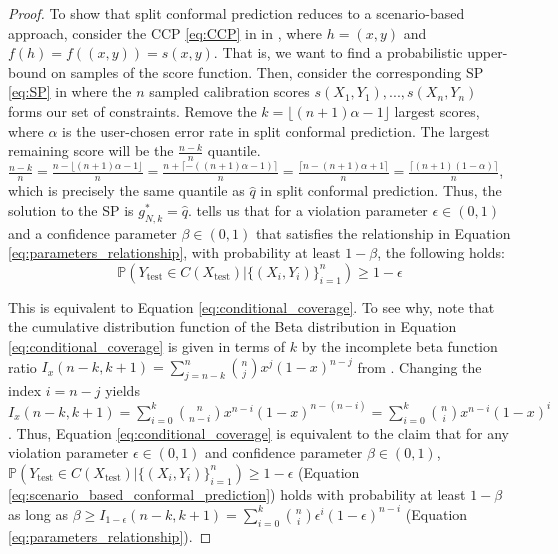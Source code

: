 \begin{proof}
    
To show that split conformal prediction reduces to a scenario-based approach, consider the CCP \eqref{eq:CCP} in  in , where $h=(x,y)$ and $f(h)=f\left((x,y)\right)=s(x,y)$.
That is, we want to find a probabilistic upper-bound on samples of the score function.
Then, consider the corresponding SP \eqref{eq:SP} in  where the $n$ sampled calibration scores $s(X_1, Y_1), ..., s(X_n, Y_n)$ forms our set of constraints.
Remove the $k=\lfloor (n+1)\alpha-1 \rfloor$ largest scores, where $\alpha$ is the user-chosen error rate in split conformal prediction.
The largest remaining score will be the $\frac{n-k}{n}$ quantile.
$\frac{n-k}{n}=\frac{n-\lfloor (n+1)\alpha-1 \rfloor}{n}=\frac{n+\lceil -((n+1)\alpha-1) \rceil}{n}=\frac{\lceil n -(n+1)\alpha + 1 \rceil}{n}=\frac{\lceil (n+1)(1-\alpha) \rceil}{n}$, which is precisely the same quantile as $\hat{q}$ in split conformal prediction. Thus, the solution to the SP is $g^*_{N,k}=\hat{q}$.  tells us that for a violation parameter $\epsilon \in (0, 1)$ and a confidence parameter $\beta \in (0, 1)$ that satisfies the relationship in Equation \eqref{eq:parameters_relationship}, with probability at least $1-\beta$, the following holds:
\begin{equation}\label{eq:scenario_based_conformal_prediction}
    \mathbb{P}\left( Y_\text{test} \in C(X_\text{test}) | \{ (X_i, Y_i) \}^n_{i=1} \right) \ge 1-\epsilon
\end{equation}

This is equivalent to Equation \eqref{eq:conditional_coverage}. To see why, note that the cumulative distribution function of the Beta distribution in Equation \eqref{eq:conditional_coverage} is given in terms of $k$ by the incomplete beta function ratio $I_x(n-k, k+1)=\sum^n_{j=n-k}\binom{n}{j}x^j(1-x)^{n-j}$ from \citet[\href{https://dlmf.nist.gov/8.17.E5}{(8.17.5)}]{NIST:DLMF}.
Changing the index $i=n-j$ yields $I_x(n-k, k+1)=\sum^k_{i=0}\binom{n}{n-i}x^{n-i}(1-x)^{n-(n-i)}=\sum^k_{i=0}\binom{n}{i}x^{n-i}(1-x)^{i}$.
Thus, Equation \eqref{eq:conditional_coverage} is equivalent to the claim that for any violation parameter $\epsilon \in (0, 1)$ and confidence parameter $\beta \in (0, 1)$, $\mathbb{P}\left( Y_\text{test} \in C(X_\text{test}) | \{ (X_i, Y_i) \}^n_{i=1} \right) \ge 1-\epsilon$ (Equation \eqref{eq:scenario_based_conformal_prediction}) holds with probability at least $1-\beta$ as long as $\beta \ge I_{1-\epsilon}(n-k, k+1)=\sum^k_{i=0}\binom{n}{i}\epsilon^{i}(1-\epsilon)^{n-i}$ (Equation \eqref{eq:parameters_relationship}).

\end{proof}

